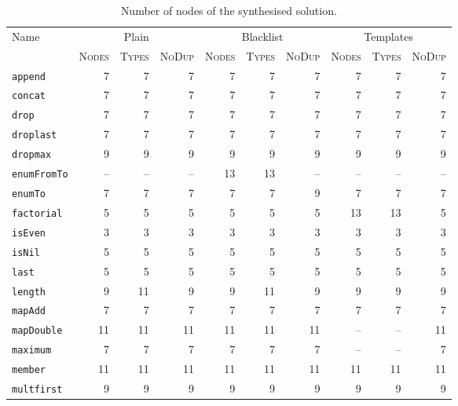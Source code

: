 {\footnotesize
\begin{longtable}{@{}lr@{\hspace{2pt}}r@{\hspace{2pt}}rr@{\hspace{2pt}}r@{\hspace{2pt}}rr@{\hspace{2pt}}r@{\hspace{2pt}}r@{}}
\caption{Number of nodes of the synthesised solution.\label{fig:nofnodestable}}\\
\toprule
Name & \multicolumn{3}{c}{\textsf{Plain}} & \multicolumn{3}{c}{\textsf{Blacklist}} & \multicolumn{3}{c}{\textsf{Templates}} \\
\cmidrule(lr){2-4} \cmidrule(lr){5-7} \cmidrule(l){8-10}
     & \textsc{Nodes} & \textsc{Types} & \textsc{NoDup} & \textsc{Nodes} & \textsc{Types} & \textsc{NoDup} & \textsc{Nodes} & \textsc{Types} & \textsc{NoDup} \\
\midrule
\lstinline|append| & 7 & 7 & 7 & 7 & 7 & 7 & 7 & 7 & 7 \\
\lstinline|concat| & 7 & 7 & 7 & 7 & 7 & 7 & 7 & 7 & 7 \\
\lstinline|drop| & 7 & 7 & 7 & 7 & 7 & 7 & 7 & 7 & 7 \\
\lstinline|droplast| & 7 & 7 & 7 & 7 & 7 & 7 & 7 & 7 & 7 \\
\lstinline|dropmax| & 9 & 9 & 9 & 9 & 9 & 9 & 9 & 9 & 9 \\
\lstinline|enumFromTo| & -- & -- & -- & 13 & 13 & -- & -- & -- & -- \\
\lstinline|enumTo| & 7 & 7 & 7 & 7 & 7 & 9 & 7 & 7 & 7 \\
\lstinline|factorial| & 5 & 5 & 5 & 5 & 5 & 5 & 13 & 13 & 5 \\
\lstinline|isEven| & 3 & 3 & 3 & 3 & 3 & 3 & 3 & 3 & 3 \\
\lstinline|isNil| & 5 & 5 & 5 & 5 & 5 & 5 & 5 & 5 & 5 \\
\lstinline|last| & 5 & 5 & 5 & 5 & 5 & 5 & 5 & 5 & 5 \\
\lstinline|length| & 9 & 11 & 9 & 9 & 11 & 9 & 9 & 9 & 9 \\
\lstinline|mapAdd| & 7 & 7 & 7 & 7 & 7 & 7 & 7 & 7 & 7 \\
\lstinline|mapDouble| & 11 & 11 & 11 & 11 & 11 & 11 & -- & -- & 11 \\
\lstinline|maximum| & 7 & 7 & 7 & 7 & 7 & 7 & -- & -- & 7 \\
\lstinline|member| & 11 & 11 & 11 & 11 & 11 & 11 & 11 & 11 & 11 \\
\lstinline|multfirst| & 9 & 9 & 9 & 9 & 9 & 9 & 9 & 9 & 9 \\

\end{longtable}}
